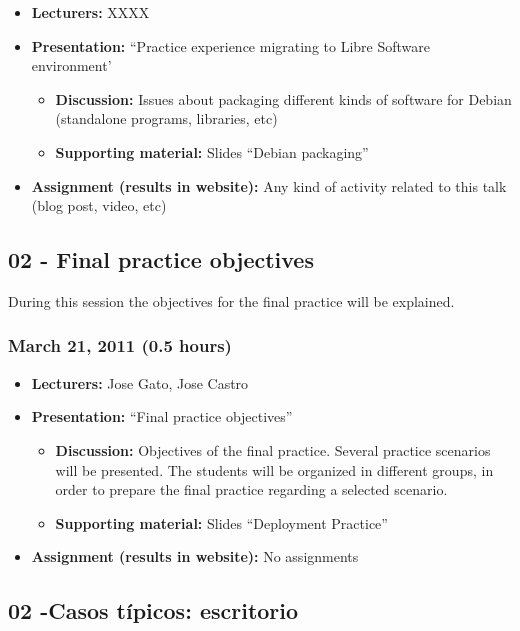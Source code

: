 \documentclass[a4paper]{article}
\begin{document}
\begin{itemize}
\item \textbf{Lecturers:} XXXX
\item \textbf{Presentation:} ``Practice experience migrating to Libre Software environment'
  \begin{itemize}
  \item \textbf{Discussion:} Issues about packaging different kinds of
    software for Debian (standalone programs, libraries, etc)
  \item \textbf{Supporting material:} Slides ``Debian packaging''
  \end{itemize}
\item \textbf{Assignment (results in website):} Any kind of activity
  related to this talk (blog post, video, etc)
\end{itemize}

\subsection{02 - Final practice objectives}

During this session the objectives for the final practice will be explained.

\subsubsection{March 21, 2011 (0.5 hours)}

\begin{itemize}
\item \textbf{Lecturers:} Jose Gato, Jose Castro
\item \textbf{Presentation:} ``Final practice objectives''
  \begin{itemize}
  \item \textbf{Discussion:} Objectives of the final practice. Several practice scenarios will be presented. The students will be organized in different groups, in order to prepare the final practice regarding a selected scenario. 
  \item \textbf{Supporting material:} Slides ``Deployment Practice''
  \end{itemize}
\item \textbf{Assignment (results in website):} No assignments 
\end{itemize}



\subsection{02 -Casos típicos: escritorio}
\end{document}
